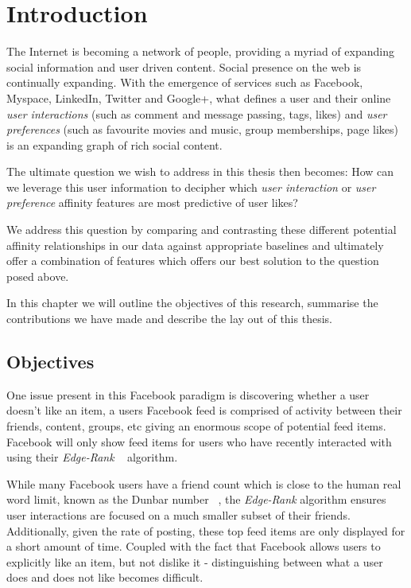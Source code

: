 
\chapter{Introduction}
\label{cha:intro}

The Internet is becoming a network of people, providing a myriad of expanding social information and user driven content. 
Social presence on the web is continually expanding. With the emergence of services such as Facebook, Myspace, LinkedIn, Twitter 
and Google+, what defines a user and their online \emph{user interactions} (such as comment and message passing, tags, likes) and \emph{user preferences} 
(such as favourite movies and music, group memberships, page likes) is an expanding graph of rich social content. 

The ultimate question we wish to address in this thesis then becomes: 
How can we leverage this user information to decipher which \emph{user interaction} or \emph{user preference} affinity features 
are most predictive of user likes? 

We address this question by comparing and contrasting these different potential affinity relationships in our data against appropriate 
baselines and ultimately offer a combination of features which offers our best solution to the question posed above.

In this chapter we will outline the objectives of this research, summarise the contributions we have made and describe the lay out of this
thesis.

\section{Objectives}
\label{sec:objectives}

One issue present in this Facebook paradigm is discovering whether a user doesn't like an item, a users Facebook feed is comprised of 
activity between their friends, content, groups, etc giving an enormous scope of potential feed items. Facebook will only show feed 
items for users who have recently interacted with using their \emph{Edge-Rank} ~\cite{edge} algorithm. 

While many Facebook users have a friend count which is close to the human real word limit, known as the Dunbar number 
~\cite{hill2003social}, the \emph{Edge-Rank} algorithm ensures user interactions are focused on a much smaller subset of their friends.
Additionally, given the rate of posting, these top feed items are only displayed for a short amount of time. Coupled 
with the fact that Facebook allows users to explicitly like an item, but not dislike it - distinguishing between what 
a user does and does not like becomes difficult.

